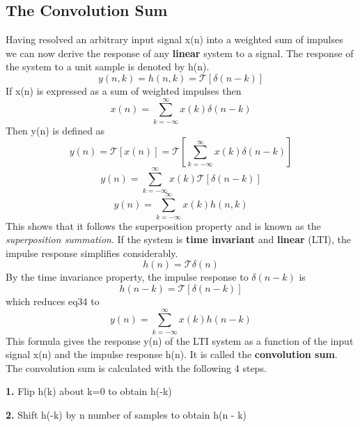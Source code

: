 \documentclass{article} %
\begin{document}
	\subsection{The Convolution Sum}
	Having resolved an arbitrary input signal x(n) into a weighted sum of impulses we can now derive the response of any \textbf{linear} system to a signal. The response of the system to a unit sample is denoted by h(n). 
	\begin{equation}
 	y(n, k) = h(n, k) = \mathcal{T}[\delta (n-k)]
	\end{equation}
	If x(n) is expressed as a sum of weighted impulses then 
	\begin{equation}
 	x(n) = \sum_{k = -\infty}^{\infty} x(k) \delta(n-k)
	\end{equation}
	Then y(n) is defined as 
	\begin{equation}
 	y(n) = \mathcal{T}[x(n)] = \mathcal{T}[\sum_{k=-\infty}^{\infty} x(k)\delta(n - k)]
	\end{equation}
	\begin{equation}
 	y(n) = \sum_{k=-\infty}^{\infty}x(k) \mathcal{T}[\delta(n - k)]
	\end{equation}
	\begin{equation}
 	y(n) = \sum_{k=-\infty}^{\infty} x(k)h(n, k)
	\end{equation}
	This shows that it follows the superposition property and is known as the \textit{superposition summation}. If the system is \textbf{time invariant} and \textbf{linear} (LTI), the impulse response simplifies considerably.
	\begin{equation}
 	h(n) = \mathcal{T} \delta(n)
	\end{equation}
	By the time invariance property, the impulse response to $\delta(n-k)$ is
	\begin{equation}
 	h(n-k) = \mathcal{T}[\delta(n-k)]
	\end{equation}
	which reduces eq34 to 
	\begin{equation}
 	y(n) = \sum_{k=-\infty}^{\infty}x(k)h(n-k)
	\end{equation}
	This formula gives the response y(n) of the LTI system as a function of the input signal x(n) and the impulse response h(n). It is called the \textbf{convolution sum}. The convolution sum is calculated with the following 4 steps.
	
	\textbf{1.} Flip h(k) about k=0 to obtain h(-k)
	
	\textbf{2.} Shift h(-k) by n number of samples to obtain h(n - k)
	
\end{document}
